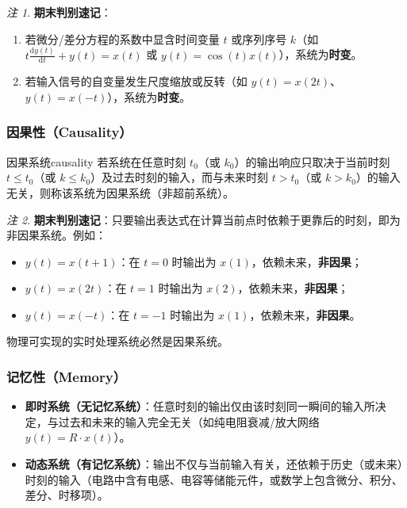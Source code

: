 \documentclass[11pt,a4paper,fontset=fandol]{ctexart}
\theoremstyle{remark}
\newtheorem{remark}{注}[section]
\begin{document}
\begin{remark}
\textbf{期末判别速记}：
\begin{enumerate}
    \item 若微分/差分方程的系数中显含时间变量 $t$ 或序列序号 $k$（如 $t \frac{\mathrm{d}y(t)}{\mathrm{d}t} + y(t) = x(t)$ 或 $y(t) = \cos(t)x(t)$），系统为\textbf{时变}。
    \item 若输入信号的自变量发生尺度缩放或反转（如 $y(t) = x(2t)$、$y(t) = x(-t)$），系统为\textbf{时变}。
\end{enumerate}
\end{remark}

\subsubsection{因果性（Causality）}
\begin{definition}{因果系统}{causality}
若系统在任意时刻 $t_0$（或 $k_0$）的输出响应只取决于当前时刻 $t \le t_0$（或 $k \le k_0$）及过去时刻的输入，而与未来时刻 $t > t_0$（或 $k > k_0$）的输入无关，则称该系统为因果系统（非超前系统）。
\end{definition}

\begin{remark}
\textbf{期末判别速记}：只要输出表达式在计算当前点时依赖于更靠后的时刻，即为非因果系统。例如：
\begin{itemize}
    \item $y(t) = x(t+1)$：在 $t=0$ 时输出为 $x(1)$，依赖未来，\textbf{非因果}；
    \item $y(t) = x(2t)$：在 $t=1$ 时输出为 $x(2)$，依赖未来，\textbf{非因果}；
    \item $y(t) = x(-t)$：在 $t=-1$ 时输出为 $x(1)$，依赖未来，\textbf{非因果}。
\end{itemize}
物理可实现的实时处理系统必然是因果系统。
\end{remark}

\subsubsection{记忆性（Memory）}
\begin{itemize}
    \item \textbf{即时系统（无记忆系统）}：任意时刻的输出仅由该时刻同一瞬间的输入所决定，与过去和未来的输入完全无关（如纯电阻衰减/放大网络 $y(t) = R \cdot x(t)$）。
    \item \textbf{动态系统（有记忆系统）}：输出不仅与当前输入有关，还依赖于历史（或未来）时刻的输入（电路中含有电感、电容等储能元件，或数学上包含微分、积分、差分、时移项）。
\end{itemize}
\end{document}
